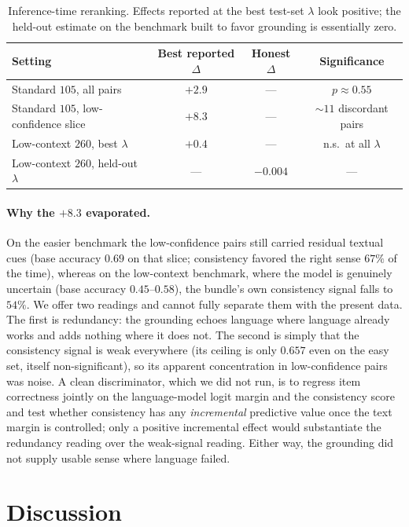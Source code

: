 \documentclass[twoside,11pt]{article}
\begin{document}
\begin{table}[t]
\centering
\begin{tabular}{lccc}
\toprule
Setting & Best reported $\Delta$ & Honest $\Delta$ & Significance \\
\midrule
Standard $105$, all pairs        & $+2.9$ & --- & $p \approx 0.55$ \\
Standard $105$, low-confidence slice & $+8.3$ & --- & $\sim$$11$ discordant pairs \\
Low-context $260$, best $\lambda$    & $+0.4$ & --- & n.s.\ at all $\lambda$ \\
Low-context $260$, held-out $\lambda$ & --- & $-0.004$ & --- \\
\bottomrule
\end{tabular}
\caption{Inference-time reranking. Effects reported at the best test-set $\lambda$ look positive; the held-out estimate on the benchmark built to favor grounding is essentially zero.}
\label{tab:rerank}
\end{table}

\paragraph{Why the $+8.3$ evaporated.}
On the easier benchmark the low-confidence pairs still carried residual textual cues (base accuracy $0.69$ on that slice; consistency favored the right sense $67\%$ of the time), whereas on the low-context benchmark, where the model is genuinely uncertain (base accuracy $0.45$--$0.58$), the bundle's own consistency signal falls to $54\%$. We offer two readings and cannot fully separate them with the present data. The first is redundancy: the grounding echoes language where language already works and adds nothing where it does not. The second is simply that the consistency signal is weak everywhere (its ceiling is only $0.657$ even on the easy set, itself non-significant), so its apparent concentration in low-confidence pairs was noise. A clean discriminator, which we did not run, is to regress item correctness jointly on the language-model logit margin and the consistency score and test whether consistency has any \emph{incremental} predictive value once the text margin is controlled; only a positive incremental effect would substantiate the redundancy reading over the weak-signal reading. Either way, the grounding did not supply usable sense where language failed.

\section{Discussion}
\end{document}
